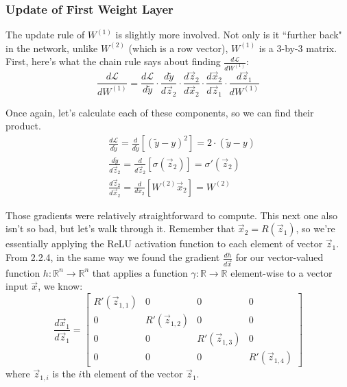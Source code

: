 \documentclass{article}
\begin{document}
\subsubsection{Update of First Weight Layer}

The update rule of $W^{(1)}$ is slightly more involved. Not only is it ``further back" in the network, unlike $W^{(2)}$ (which is a row vector), $W^{(1)}$ is a 3-by-3 matrix. First, here's what the chain rule says about finding $\frac{d\mathcal{L}}{d W^{(1)}}$: \\

\[\frac{d\mathcal{L}}{d W^{(1)}} = \frac{d\mathcal{L}}{d \tilde{y}} \cdot \frac{d\tilde{y}}{d\vec{z}_2} \cdot \frac{d\vec{z}_2}{d \vec{x}_2} \cdot \frac{d\vec{x}_2}{d\vec{z}_1}\cdot \frac{d\vec{z}_1}{d W^{(1)}}\]

Once again, let's calculate each of these components, so we can find their product. \\
\begin{align*}
& \frac{d\mathcal{L}}{d \tilde{y}} = \frac{d}{d \tilde{y}} \left[(\tilde{y} - y)^2\right] = 2 \cdot(\tilde{y} - y) \\
& \frac{d\tilde{y}}{d\vec{z}_2} = \frac{d}{d\vec{z}_2}\left[\sigma(\vec{z}_2)\right] = \sigma'(\vec{z}_2) \\
&\frac{d\vec{z}_2}{d \vec{x}_2} = \frac{d}{d x_{2}} \left[W^{(2)}\vec{x}_2\right] = W^{(2)}
\end{align*}

Those gradients were relatively straightforward to compute. This next one also isn't so bad, but let's walk through it. Remember that $\vec{x}_2 = R\left(\vec{z}_1\right)$, so we're essentially applying the ReLU activation function to each element of vector $\vec{z}_1$. \\

From 2.2.4, in the same way we found the gradient $\frac{dh}{d\vec{x}}$ for our vector-valued function $h: \mathbb{R}^{n} \to \mathbb{R}^n$ that applies a function $\gamma: \mathbb{R} \to \mathbb{R}$ element-wise to a vector input $\vec{x}$, we know:
\[\frac{d \vec{x}_{1}}{d \vec{z}_1} = \begin{bmatrix}R'(\vec{z}_{1, 1}) & 0 & 0 & 0 \\
0 & R'(\vec{z}_{1, 2}) & 0 & 0 \\
0 & 0 & R'(\vec{z}_{1, 3}) & 0 \\
0 & 0 & 0 & R'(\vec{z}_{1, 4})
\end{bmatrix}\]
where $\vec{z}_{1, i}$ is the $i$th element of the vector $\vec{z}_1$. \\
\end{document}
